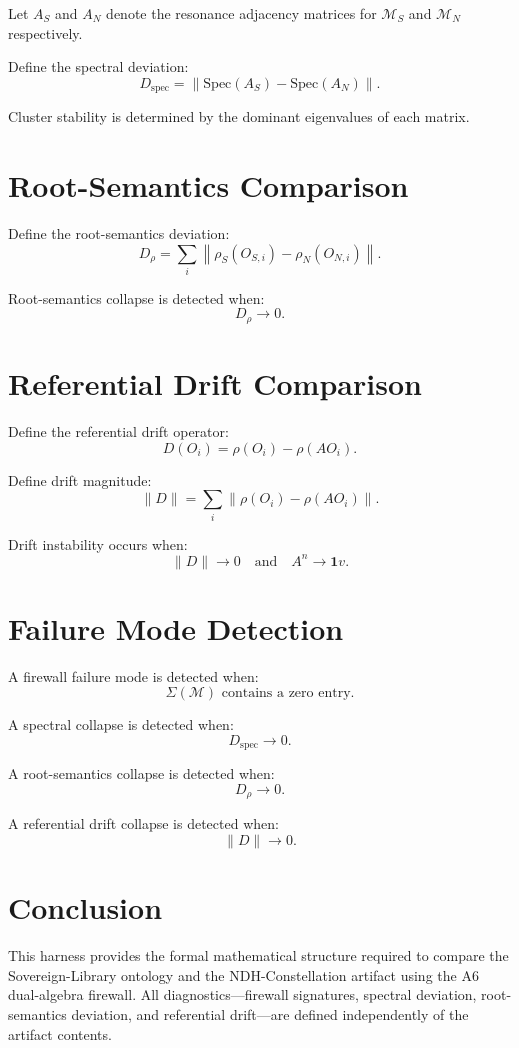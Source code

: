 \documentclass[11pt]{article}
\begin{document}
Let $A_S$ and $A_N$ denote the resonance adjacency matrices for $\mathcal{M}_S$
and $\mathcal{M}_N$ respectively.

Define the spectral deviation:
\[
D_{\mathrm{spec}} = \left\| \mathrm{Spec}(A_S) - \mathrm{Spec}(A_N) \right\|.
\]

Cluster stability is determined by the dominant eigenvalues of each matrix.

\section{Root-Semantics Comparison}

Define the root-semantics deviation:
\[
D_{\rho} = \sum_{i} \left\| \rho_S(O_{S,i}) - \rho_N(O_{N,i}) \right\|.
\]

Root-semantics collapse is detected when:
\[
D_{\rho} \to 0.
\]

\section{Referential Drift Comparison}

Define the referential drift operator:
\[
D(O_i) = \rho(O_i) - \rho(A O_i).
\]

Define drift magnitude:
\[
\|D\| = \sum_i \left\| \rho(O_i) - \rho(A O_i) \right\|.
\]

Drift instability occurs when:
\[
\|D\| \to 0 \quad \text{and} \quad A^n \to \mathbf{1} v.
\]

\section{Failure Mode Detection}

A firewall failure mode is detected when:
\[
\Sigma(\mathcal{M}) \text{ contains a zero entry}.
\]

A spectral collapse is detected when:
\[
D_{\mathrm{spec}} \to 0.
\]

A root-semantics collapse is detected when:
\[
D_{\rho} \to 0.
\]

A referential drift collapse is detected when:
\[
\|D\| \to 0.
\]

\section{Conclusion}

This harness provides the formal mathematical structure required to compare the
Sovereign-Library ontology and the NDH-Constellation artifact using the A6
dual-algebra firewall. All diagnostics—firewall signatures, spectral deviation,
root-semantics deviation, and referential drift—are defined independently of the
artifact contents.
\end{document}
